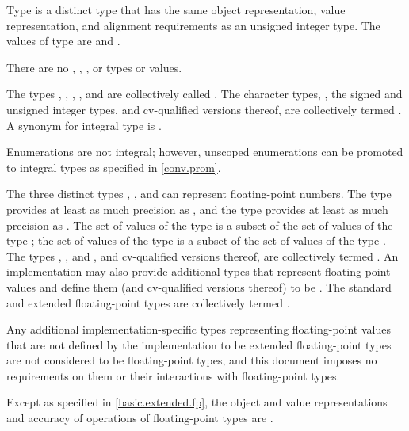 \pnum
{}%
%
Type  is a distinct type that has
the same object representation,
value representation, and
alignment requirements as
an  unsigned integer type.
The values of type  are
 and .
\begin{note}
There are no , ,
, or  types or values.
\end{note}

\pnum
{}%
The types , ,
, , and 
are collectively called .
The character types, ,
the signed and unsigned integer types,
and cv-qualified versions thereof,
are collectively termed
.
A synonym for integral type is .
\begin{note}
Enumerations are not integral;
however, unscoped enumerations can be promoted to integral types
as specified in \ref{conv.prom}.
\end{note}

\pnum
{}%
The three distinct types
%
,
%
,
and
%
can represent floating-point numbers.
The type  provides at least as much
precision as , and the type  provides at
least as much precision as . The set of values of the type
 is a subset of the set of values of the type
; the set of values of the type  is a subset
of the set of values of the type .
The types
, , and ,
and cv-qualified versions thereof,
are collectively termed
.
An implementation may also provide additional types
that represent floating-point values and define them (and cv-qualified versions thereof) to be
.
The standard and extended floating-point types
are collectively termed .
\begin{note}
Any additional implementation-specific types representing floating-point values
that are not defined by the implementation to be extended floating-point types
are not considered to be floating-point types, and
this document imposes no requirements on them or
their interactions with floating-point types.
\end{note}
Except as specified in \ref{basic.extended.fp},
the object and value representations and accuracy of operations
of floating-point types are .

